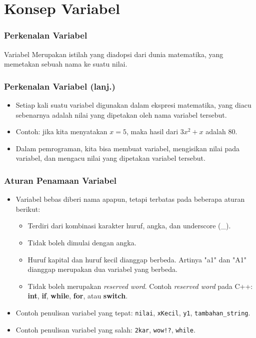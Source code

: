 \section{Konsep Variabel}
\frame{\sectionpage}

\begin{frame}
\frametitle{Perkenalan Variabel}
\begin{block}{Variabel}
   Merupakan istilah yang diadopsi dari dunia matematika, yang memetakan sebuah nama ke suatu nilai.
\end{block}
\end{frame}

\begin{frame}
\frametitle{Perkenalan Variabel (lanj.)}
\begin{itemize}
  \item Setiap kali suatu variabel digunakan dalam ekspresi matematika, yang diacu sebenarnya adalah nilai yang dipetakan oleh nama variabel tersebut.
  \item Contoh: jika kita menyatakan $x=5$, maka hasil dari $3x^2 + x$ adalah $80$.
  \item Dalam pemrograman, kita bisa membuat variabel, mengisikan nilai pada variabel, dan mengacu nilai yang dipetakan variabel tersebut.
\end{itemize}
\end{frame}

\begin{frame}
\frametitle{Aturan Penamaan Variabel}
\begin{itemize}
  \item Variabel bebas diberi nama apapun, tetapi terbatas pada beberapa aturan berikut:
  \begin{itemize}
    \item Terdiri dari kombinasi karakter huruf, angka, dan underscore (\_).
    \item Tidak boleh dimulai dengan angka.
    \item Huruf kapital dan huruf kecil dianggap berbeda. Artinya "a1" dan "A1" dianggap merupakan dua variabel yang berbeda.
    \item Tidak boleh merupakan \alert{\textit{reserved word}}. Contoh \textit{reserved word} pada C++: \textbf{int}, \textbf{if}, \textbf{while}, \textbf{for}, atau \textbf{switch}.
  \end{itemize}
  \item Contoh penulisan variabel yang tepat: \texttt{nilai}, \texttt{xKecil}, \texttt{y1}, \texttt{tambahan\_string}.
  \item Contoh penulisan variabel yang salah: \texttt{2kar}, \texttt{wow!?}, \texttt{while}.
\end{itemize}
\end{frame}

